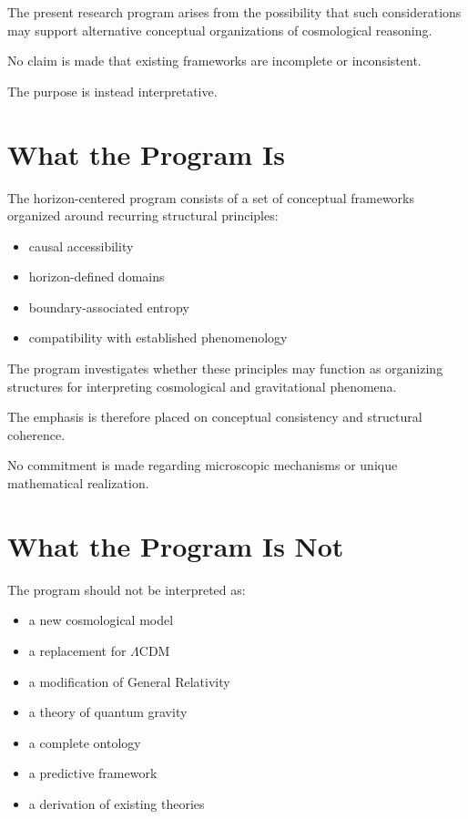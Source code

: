 \documentclass[12pt,a4paper]{article}
\begin{document}
The present research program arises from the possibility that such considerations may support alternative conceptual organizations of cosmological reasoning.

No claim is made that existing frameworks are incomplete or inconsistent.

The purpose is instead interpretative.

\section{What the Program Is}

The horizon-centered program consists of a set of conceptual frameworks organized around recurring structural principles:

\begin{itemize}
  \item causal accessibility
  \item horizon-defined domains
  \item boundary-associated entropy
  \item compatibility with established phenomenology
\end{itemize}

The program investigates whether these principles may function as organizing structures for interpreting cosmological and gravitational phenomena.

The emphasis is therefore placed on conceptual consistency and structural coherence.

No commitment is made regarding microscopic mechanisms or unique mathematical realization.

\section{What the Program Is Not}

The program should not be interpreted as:

\begin{itemize}
  \item a new cosmological model
  \item a replacement for $\Lambda$CDM
  \item a modification of General Relativity
  \item a theory of quantum gravity
  \item a complete ontology
  \item a predictive framework
  \item a derivation of existing theories
\end{itemize}
\end{document}
